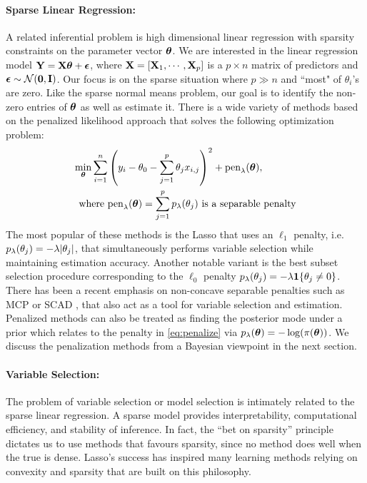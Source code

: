 \documentclass[11pt]{article}
\begin{document}
\paragraph{Sparse Linear Regression:} A related inferential problem is high dimensional linear regression with sparsity constraints on the parameter vector $\boldsymbol{\theta}$. We are interested in the linear regression model ${\bf Y} = {\bf X} \boldsymbol{\theta} + \boldsymbol{\epsilon}$, where ${\bf X} = [{\bf X}_1, \cdots, {\bf X}_p]$ is a $p \times n$ matrix of predictors and $\boldsymbol{\epsilon} \sim {\cal N}({\bf 0}, {\bf I})$. Our focus is on the sparse situation where $p \gg n$ and ``most" of $\theta_i$'s are zero. Like the sparse normal means problem, our goal is to identify the non-zero entries of $\boldsymbol{\theta}$ as well as estimate it. There is a wide variety of methods based on the penalized likelihood approach that solves the following optimization problem:
\begin{align}
\min_{\boldsymbol{\theta}} \sum_{i=1}^{n} &  \left( y_i - \theta_0 - \sum_{j=1}^{p} \theta_j x_{i,j} \right)^2 + \text{pen}_{\lambda}(\boldsymbol{\theta}), \label{eq:penalize} \\
\text{where } & \text{pen}_{\lambda}(\boldsymbol{\theta}) = \sum_{j=1}^{p} p_{\lambda}(\theta_j) \text{ is a separable penalty} \nonumber
\end{align}
 The most popular of these methods is the Lasso that uses an $\ell_1$ penalty, i.e. $p_{\lambda}(\theta_j) = -\lambda \lvert\theta_j\rvert$, that simultaneously performs variable selection while maintaining estimation accuracy. Another notable variant is the best subset selection procedure corresponding to the $\ell_0$ penalty $p_{\lambda}(\theta_j) = -\lambda {\bf 1}\{\theta_j \ne 0\}$. There has been a recent emphasis on non-concave separable penalties such as MCP \citep{zhang2010nearly} or SCAD \citep{fan2001variable}, that also act as a tool for variable selection and estimation. Penalized methods can also be treated as finding the posterior mode under a prior which relates to the penalty in \eqref{eq:penalize} via $p_{\lambda}(\boldsymbol{\theta}) = -\log(\pi(\boldsymbol{\theta}))$. We discuss the penalization methods from a Bayesian viewpoint in the next section. 

\paragraph{Variable Selection:} The problem of variable selection or model selection is intimately related to the sparse linear regression.  A sparse model provides interpretability, computational efficiency, and stability of inference.  In fact, the ``bet on sparsity'' principle \citep{hastie09} dictates us to use methods that favours sparsity, since no method does well when the true is dense. Lasso's success has inspired many learning methods relying on convexity and sparsity that are built on this philosophy. 
\end{document}
